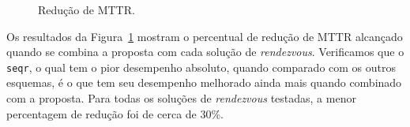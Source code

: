 {%
\begin{figure}[!htb]
	\centering
	\caption{Redução de MTTR.}
	\label{fig:mttrgain}
\end{figure} 







Os resultados da Figura~\ref{fig:mttrgain} mostram o percentual de redução de MTTR alcançado quando se combina a proposta com cada solução de {\it rendezvous}. Verificamos que o {\tt seqr}, o qual tem o pior desempenho absoluto, quando comparado com os outros esquemas, é o que tem seu desempenho melhorado ainda mais quando combinado com a proposta. Para todas os soluções de {\it rendezvous} testadas, a menor percentagem de redução foi de cerca de 30\%. %


}
